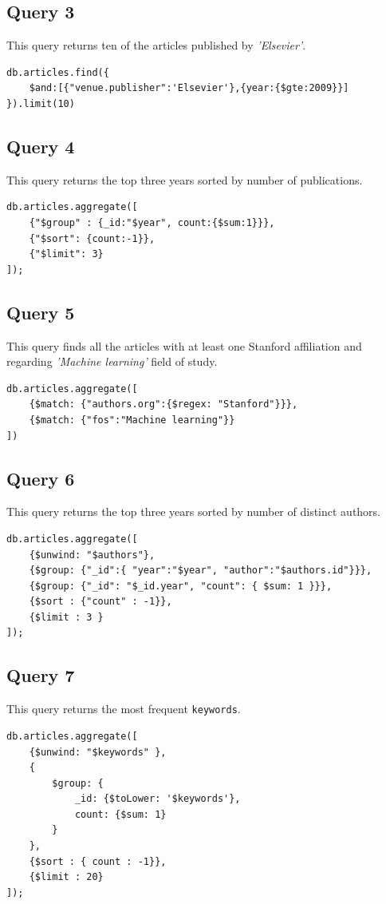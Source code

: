 \documentclass{Configuration_Files/PoliMi3i_thesis}
\begin{document}
\subsection{Query 3}
This query returns ten of the articles published by \emph{'Elsevier'}.
\begin{lstlisting}
db.articles.find({
	$and:[{"venue.publisher":'Elsevier'},{year:{$gte:2009}}]
}).limit(10)
\end{lstlisting}

\subsection{Query 4}
This query returns the top three years sorted by number of publications.
\begin{lstlisting}
db.articles.aggregate([
	{"$group" : {_id:"$year", count:{$sum:1}}},
	{"$sort": {count:-1}},
	{"$limit": 3}
]);
\end{lstlisting}

\subsection{Query 5}
This query finds all the articles with at least one Stanford affiliation and regarding \emph{'Machine learning'} field
of study.
\begin{lstlisting}
db.articles.aggregate([
	{$match: {"authors.org":{$regex: "Stanford"}}},
	{$match: {"fos":"Machine learning"}}
])
\end{lstlisting}

\subsection{Query 6}
This query returns the top three years sorted by number of distinct authors.
\begin{lstlisting}
db.articles.aggregate([
	{$unwind: "$authors"},
	{$group: {"_id":{ "year":"$year", "author":"$authors.id"}}},
	{$group: {"_id": "$_id.year", "count": { $sum: 1 }}},
	{$sort : {"count" : -1}},
	{$limit : 3 }
]);
\end{lstlisting}

\subsection{Query 7}
This query returns the most frequent \verb |keywords|.
\begin{lstlisting}
db.articles.aggregate([
	{$unwind: "$keywords" },
	{
		$group: {
			_id: {$toLower: '$keywords'},
			count: {$sum: 1}
		}
	},
	{$sort : { count : -1}},
	{$limit : 20}
]);
\end{lstlisting}
\end{document}
